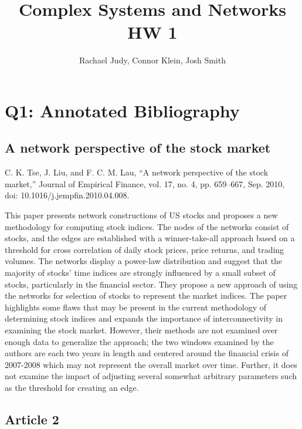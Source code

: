 \documentclass[12pt]{article}
\title{Complex Systems and Networks HW 1}
\author{Rachael Judy, Connor Klein, Josh Smith}
\begin{document}
\pgfplotsset{compat=1.18}
 
\maketitle

\section{Q1: Annotated Bibliography}


\subsection{A network perspective of the stock market}
C. K. Tse, J. Liu, and F. C. M. Lau, “A network perspective of the stock market,” Journal of Empirical Finance, vol. 17, no. 4, pp. 659–667, Sep. 2010, doi: 10.1016/j.jempfin.2010.04.008.
\newline

This paper presents network constructions of US stocks and proposes a new methodology for computing stock indices. The nodes of the networks consist of stocks, and the edges are established with a winner-take-all approach based on a threshold for cross correlation of daily stock prices, price returns, and trading volumes. The networks display a power-law distribution and suggest that the majority of stocks' time indices are strongly influenced by a small subset of stocks, particularly in the financial sector. They propose a new approach of using the networks for selection of stocks to represent the market indices. The paper highlights some flaws that may be present in the current methodology of determining stock indices and expands the importance of interconnectivity in examining the stock market. However, their methods are not examined over enough data to generalize the approach; the two windows examined by the authors are each two years in length and centered around the financial crisis of 2007-2008 which may not represent the overall market over time. Further, it does not examine the impact of adjusting several somewhat arbitrary parameters such as the threshold for creating an edge.


\subsection{Article 2}
\end{document}
